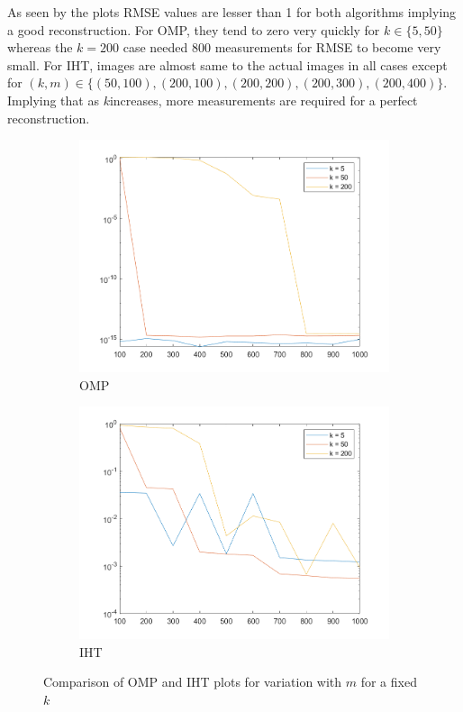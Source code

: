 \documentclass[a4paper, landscape]{article}
\begin{document}
As seen by the plots RMSE values are lesser than 1 for both algorithms implying a good reconstruction. For OMP, they tend to zero very quickly for $k\in\{5,50\}$ whereas the $k=200$ case needed $800$ measurements for RMSE to become very small. For IHT, images are almost same to the actual images in all cases except for $(k,m)\in\{(50,100), (200,100), (200,200), (200,300), (200,400)\}$. Implying that as $k$increases, more measurements are required for a perfect reconstruction.
\begin{figure}[H]
    \centering
    \begin{subfigure}{0.45\linewidth}
        \centering
        \includegraphics[width=\linewidth]{omp/plot k.png}
        \caption{OMP}
    \end{subfigure}
    \begin{subfigure}{0.45\linewidth}
        \centering
        \includegraphics[width=\linewidth]{iht/plot k.png}
        \caption{IHT}
    \end{subfigure}
    \caption{Comparison of OMP and IHT plots for variation with $m$ for a fixed $k$}
    \label{fig:ck}
\end{figure}
\end{document}
